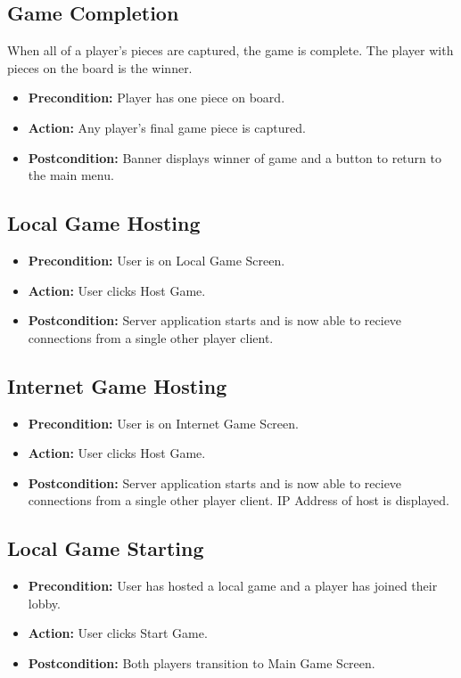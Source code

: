 \subsection{Game Completion}
When all of a player's pieces are captured, the game is complete. The player
with pieces on the board is the winner.
\begin{itemize}
  \item
    \textbf{Precondition:} Player has one piece on board.
  \item
    \textbf{Action:} Any player's final game piece is captured.
  \item
    \textbf{Postcondition:} Banner displays winner of game and a button to
    return to the main menu.
\end{itemize}

\subsection{Local Game Hosting}
\begin{itemize}
  \item
    \textbf{Precondition:} User is on Local Game Screen.
  \item
    \textbf{Action:} User clicks Host Game.
  \item
    \textbf{Postcondition:} Server application starts and is now able to
    recieve connections from a single other player client.
\end{itemize}

\subsection{Internet Game Hosting}
\begin{itemize}
  \item
    \textbf{Precondition:} User is on Internet Game Screen.
  \item
    \textbf{Action:} User clicks Host Game.
  \item
    \textbf{Postcondition:} Server application starts and is now able to
    recieve connections from a single other player client. IP Address of host
    is displayed.
\end{itemize}

\subsection{Local Game Starting}
\begin{itemize}
  \item
    \textbf{Precondition:} User has hosted a local game and a player has joined
    their lobby.
  \item
    \textbf{Action:} User clicks Start Game.
  \item
    \textbf{Postcondition:} Both players transition to Main Game Screen.
\end{itemize}

